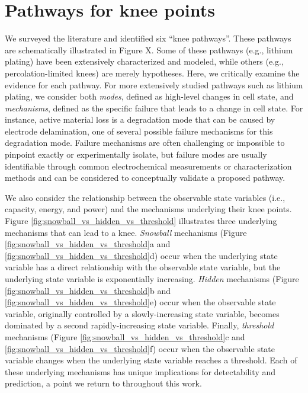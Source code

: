 \documentclass[journal=jpcl, manuscript=article, layout=onecolumn]{achemso}
\begin{document}


\section{Pathways for knee points}

We surveyed the literature and identified six ``knee pathways''. These pathways are schematically illustrated in Figure X. Some of these pathways (e.g., lithium plating) have been extensively characterized and modeled, while others (e.g., percolation-limited knees) are merely hypotheses. Here, we critically examine the evidence for each pathway. For more extensively studied pathways such as lithium plating, we consider both \textit{modes}, defined as high-level changes in cell state, and \textit{mechanisms}, defined as the specific failure that leads to a change in cell state. For instance, active material loss is a degradation mode that can be caused by electrode delamination, one of several possible failure mechanisms for this degradation mode. Failure mechanisms are often challenging or impossible to pinpoint exactly or experimentally isolate, but failure modes are usually identifiable through common electrochemical measurements or characterization methods and can be considered to conceptually validate a proposed pathway.

We also consider the relationship between the observable state variables (i.e., capacity, energy, and power) and the mechanisms underlying their knee points. Figure \ref{fig:snowball_vs_hidden_vs_threshold} illustrates three underlying mechanisms that can lead to a knee. \textit{Snowball} mechanisms (Figure \ref{fig:snowball_vs_hidden_vs_threshold}a and \ref{fig:snowball_vs_hidden_vs_threshold}d) occur when the underlying state variable has a direct relationship with the observable state variable, but the underlying state variable is exponentially increasing. \textit{Hidden} mechanisms (Figure \ref{fig:snowball_vs_hidden_vs_threshold}b and \ref{fig:snowball_vs_hidden_vs_threshold}e) occur when the observable state variable, originally controlled by a slowly-increasing state variable, becomes dominated by a second rapidly-increasing state variable. Finally, \textit{threshold} mechanisms (Figure \ref{fig:snowball_vs_hidden_vs_threshold}c and \ref{fig:snowball_vs_hidden_vs_threshold}f) occur when the observable state variable changes when the underlying state variable reaches a threshold. Each of these underlying mechanisms has unique implications for detectability and prediction, a point we return to throughout this work.
\end{document}
